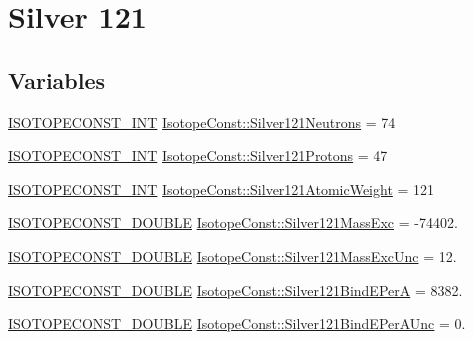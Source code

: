 \hypertarget{group___isotope_const-_silver-_ag121}{}\section{Silver 121}
\label{group___isotope_const-_silver-_ag121}
\subsection*{Variables}
\begin{DoxyCompactItemize}
\item 
\mbox{\hyperlink{group___isotope_const-_macros_ga5f18360b3e99483a35c32d789e62621c}{I\+S\+O\+T\+O\+P\+E\+C\+O\+N\+S\+T\+\_\+\+I\+NT}} \mbox{\hyperlink{group___isotope_const-_silver-_ag121_ga350248ea2b32ef50c62b20ac21ed03a1}{Isotope\+Const\+::\+Silver121\+Neutrons}} = 74
\item 
\mbox{\hyperlink{group___isotope_const-_macros_ga5f18360b3e99483a35c32d789e62621c}{I\+S\+O\+T\+O\+P\+E\+C\+O\+N\+S\+T\+\_\+\+I\+NT}} \mbox{\hyperlink{group___isotope_const-_silver-_ag121_gae5d85403817e9903e72ba53b1bccdc91}{Isotope\+Const\+::\+Silver121\+Protons}} = 47
\item 
\mbox{\hyperlink{group___isotope_const-_macros_ga5f18360b3e99483a35c32d789e62621c}{I\+S\+O\+T\+O\+P\+E\+C\+O\+N\+S\+T\+\_\+\+I\+NT}} \mbox{\hyperlink{group___isotope_const-_silver-_ag121_ga3bc02290dd2d6caa2d2917a99626a8ea}{Isotope\+Const\+::\+Silver121\+Atomic\+Weight}} = 121
\item 
\mbox{\hyperlink{group___isotope_const-_macros_ga8f45a7272ce02c0b4c65c44636ed719a}{I\+S\+O\+T\+O\+P\+E\+C\+O\+N\+S\+T\+\_\+\+D\+O\+U\+B\+LE}} \mbox{\hyperlink{group___isotope_const-_silver-_ag121_gac23c043129c5150cb0a5db184b3a0d6a}{Isotope\+Const\+::\+Silver121\+Mass\+Exc}} = -\/74402.
\item 
\mbox{\hyperlink{group___isotope_const-_macros_ga8f45a7272ce02c0b4c65c44636ed719a}{I\+S\+O\+T\+O\+P\+E\+C\+O\+N\+S\+T\+\_\+\+D\+O\+U\+B\+LE}} \mbox{\hyperlink{group___isotope_const-_silver-_ag121_gae98ac0e2056f61bdfc3cc855b86b06ae}{Isotope\+Const\+::\+Silver121\+Mass\+Exc\+Unc}} = 12.
\item 
\mbox{\hyperlink{group___isotope_const-_macros_ga8f45a7272ce02c0b4c65c44636ed719a}{I\+S\+O\+T\+O\+P\+E\+C\+O\+N\+S\+T\+\_\+\+D\+O\+U\+B\+LE}} \mbox{\hyperlink{group___isotope_const-_silver-_ag121_gadf2618b3a1a9513e479bdf9297266b15}{Isotope\+Const\+::\+Silver121\+Bind\+E\+PerA}} = 8382.
\item 
\mbox{\hyperlink{group___isotope_const-_macros_ga8f45a7272ce02c0b4c65c44636ed719a}{I\+S\+O\+T\+O\+P\+E\+C\+O\+N\+S\+T\+\_\+\+D\+O\+U\+B\+LE}} \mbox{\hyperlink{group___isotope_const-_silver-_ag121_ga569446697c4a7a59480e3bf6364b8aab}{Isotope\+Const\+::\+Silver121\+Bind\+E\+Per\+A\+Unc}} = 0.

\end{DoxyCompactItemize}
